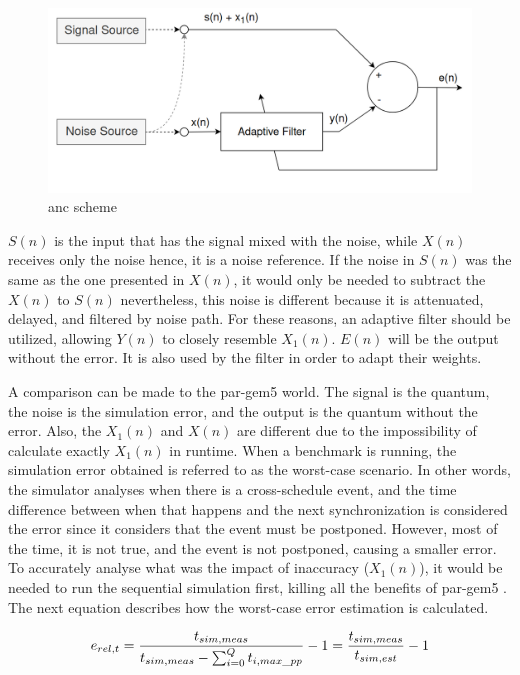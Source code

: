 \begin{figure}[H]
	\centering
 	\includegraphics[width=0.7\linewidth]{Images/AdaptiveNoiseCancellationScheme.png}
 	\caption{\gls{anc} scheme}
	 \label{fig_AdaptiveNoiseCancellationScheme}
\end{figure}

$S(n)$ is the input that has the signal mixed with the noise, while $X(n)$ receives only the noise hence, it is a noise reference. If the noise 
in $S(n)$ was the same as the one presented in $X(n)$, it would only be needed to subtract the $X(n)$ to $S(n)$ nevertheless, this noise is 
different because it is attenuated, delayed, and filtered by noise path. For these reasons, an adaptive filter should be utilized, allowing 
$Y(n)$ to closely resemble $X_{1}(n)$. $E(n)$ will be the output without the error. It is also used by the filter in order to adapt their weights.

A comparison can be made to the par-gem5 world. The signal is the quantum, the noise is the simulation error, and the output is the quantum 
without the error. Also, the $X_{1}(n)$ and $X(n)$ are different due to the impossibility of calculate exactly $X_{1}(n)$ in runtime. When a 
benchmark is running, the simulation error obtained is referred to as the worst-case scenario. In other words, the simulator analyses when there 
is a cross-schedule event, and the time difference between when that happens and the next synchronization is considered the error since it 
considers that the event must be postponed. However, most of the time, it is not true, and the event is not postponed, causing a smaller error. To 
accurately analyse what was the impact of inaccuracy ($X_{1}(n)$), it would be needed to run the sequential simulation first, killing 
all the benefits of par-gem5 \cite{pargem5}. The next equation describes how the worst-case error estimation is calculated. 

\begin{equation}
    \label{eq_errSim}
    \centering
        \Large
        e_{rel,t} = \frac{t_{sim,meas}}{t_{sim,meas}-\sum_{i=0}^{Q}t_{i,max\_pp}} -1  = \frac{t_{sim,meas}}{t_{sim,est}}-1
        \normalsize
\end{equation}
\vspace{0.3cm}

